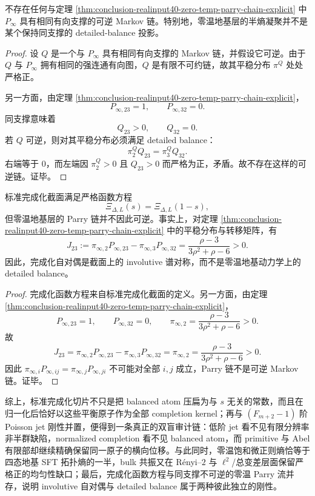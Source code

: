 \begin{theorem}[零温四态地基支撑的不可逆性]\label{thm:conclusion-realinput40-ground-support-irreversibility}
不存在任何与定理 \ref{thm:conclusion-realinput40-zero-temp-parry-chain-explicit} 中 \(P_\infty\) 具有相同有向支撑的可逆 Markov 链。特别地，零温地基层的半熵凝聚并不是某个保持同支撑的 detailed-balance 投影。
\end{theorem}
\begin{proof}
设 \(Q\) 是一个与 \(P_\infty\) 具有相同有向支撑的 Markov 链，并假设它可逆。由于 \(Q\) 与 \(P_\infty\) 拥有相同的强连通有向图，\(Q\) 是有限不可约链，故其平稳分布 \(\pi^Q\) 处处严格正。

另一方面，由定理 \ref{thm:conclusion-realinput40-zero-temp-parry-chain-explicit}，
\[
P_{\infty,23}=1,
\qquad
P_{\infty,32}=0.
\]
同支撑意味着
\[
Q_{23}>0,
\qquad
Q_{32}=0.
\]
若 \(Q\) 可逆，则对其平稳分布必须满足 detailed balance：
\[
\pi^Q_2Q_{23}=\pi^Q_3Q_{32}.
\]
右端等于 \(0\)，而左端因 \(\pi^Q_2>0\) 且 \(Q_{23}>0\) 而严格为正，矛盾。故不存在这样的可逆链。证毕。
\end{proof}

\begin{corollary}\label{cor:conclusion-realinput40-selfdual-completion-not-detailed-balance}
标准完成化截面满足严格函数方程
\[
\Xi_{\Delta,L}(s)=\Xi_{\Delta,L}(1-s),
\]
但零温地基层的 Parry 链并不因此可逆。事实上，对定理 \ref{thm:conclusion-realinput40-zero-temp-parry-chain-explicit} 中的平稳分布与转移矩阵，有
\[
J_{23}
:=
\pi_{\infty,2}P_{\infty,23}-\pi_{\infty,3}P_{\infty,32}
=
\frac{\rho-3}{3\rho^2+\rho-6}
>0.
\]
因此，完成化自对偶是截面上的 involutive 谱对称，而不是零温地基动力学上的 detailed balance。
\end{corollary}
\begin{proof}
完成化函数方程来自标准完成化截面的定义。另一方面，由定理 \ref{thm:conclusion-realinput40-zero-temp-parry-chain-explicit}，
\[
P_{\infty,23}=1,
\qquad
P_{\infty,32}=0,
\qquad
\pi_{\infty,2}=\frac{\rho-3}{3\rho^2+\rho-6}>0.
\]
故
\[
J_{23}
=
\pi_{\infty,2}P_{\infty,23}-\pi_{\infty,3}P_{\infty,32}
=
\pi_{\infty,2}
=
\frac{\rho-3}{3\rho^2+\rho-6}
>0.
\]
因此 \(\pi_{\infty,i}P_{\infty,ij}=\pi_{\infty,j}P_{\infty,ji}\) 不可能对全部 \(i,j\) 成立，Parry 链不是可逆 Markov 链。证毕。
\end{proof}

综上，标准完成化切片不只是把 balanced atom 压扁为与 \(s\) 无关的常数，而且在归一化后恰好以这些平衡原子作为全部 completion kernel；再与 \((F_{m+2}-1)\) 阶 Poisson jet 刚性并置，便得到一条真正的双盲审计链：低阶 jet 看不见有限分辨率非半群缺陷，normalized completion 看不见 balanced atom，而 primitive 与 Abel 有限部却继续精确保留同一原子的横向位移。与此同时，零温饱和微正则熵恰等于四态地基 SFT 拓扑熵的一半，bulk 共振又在 Rényi--\(2\) 与 \(\ell^2\)/总变差层面保留严格正的均匀性缺口；最后，完成化函数方程与同支撑不可逆的零温 Parry 流并存，说明 involutive 自对偶与 detailed balance 属于两种彼此独立的刚性。

\endinput
